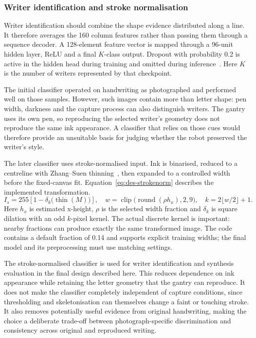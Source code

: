 \subsubsection{Writer identification and stroke normalisation}
\label{sec:des-shapenamer}
Writer identification should combine the shape evidence distributed along a line. It therefore averages the 160 column features rather than passing them through a sequence decoder. A 128-element feature vector is mapped through a 96-unit hidden layer, ReLU and a final $K$-class output. Dropout with probability 0.2 is active in the hidden head during training and omitted during inference~\cite[pp.~1931, 1934]{srivastava2014}. Here $K$ is the number of writers represented by that checkpoint.

The initial classifier operated on handwriting as photographed and performed well on those samples. However, such images contain more than letter shape: pen width, darkness and the capture process can also distinguish writers. The gantry uses its own pen, so reproducing the selected writer's geometry does not reproduce the same ink appearance. A classifier that relies on those cues would therefore provide an unsuitable basis for judging whether the robot preserved the writer's style.

The later classifier uses stroke-normalised input. Ink is binarised, reduced to a centreline with Zhang--Suen thinning~\cite[p.~237]{zhang1984}, then expanded to a controlled width before the fixed-canvas fit. Equation~\ref{eq:des-strokenorm} describes the implemented transformation.
\begin{equation}
I_s=255\left[1-\delta_k\bigl(\operatorname{thin}(M)\bigr)\right],\quad
w=\operatorname{clip}\bigl(\operatorname{round}(\rho h_x),2,9\bigr),\quad
k=2\lfloor w/2\rfloor+1.
\label{eq:des-strokenorm}
\end{equation}
Here $h_x$ is estimated x-height, $\rho$ is the selected width fraction and $\delta_k$ is square dilation with an odd $k$-pixel kernel. The actual discrete kernel is important: nearby fractions can produce exactly the same transformed image. The code contains a default fraction of 0.14 and supports explicit training widths; the final model and its preprocessing must use matching settings.

The stroke-normalised classifier is used for writer identification and synthesis evaluation in the final design described here. This reduces dependence on ink appearance while retaining the letter geometry that the gantry can reproduce. It does not make the classifier completely independent of capture conditions, since thresholding and skeletonisation can themselves change a faint or touching stroke. It also removes potentially useful evidence from original handwriting, making the choice a deliberate trade-off between photograph-specific discrimination and consistency across original and reproduced writing.

